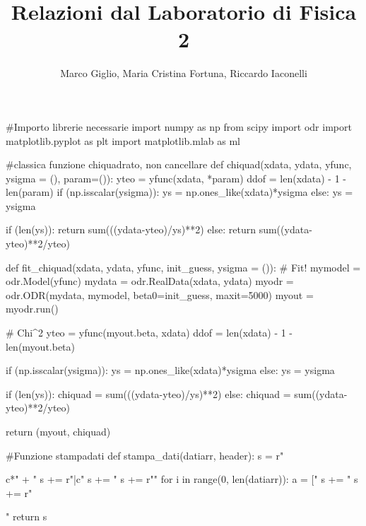 \documentclass[a4paper,10pt]{report}
\author{Marco Giglio, Maria Cristina Fortuna, Riccardo Iaconelli}
\title{Relazioni dal Laboratorio di Fisica 2}
\begin{document}
\maketitle

\tableofcontents

\begin{sagesilent}
#Importo librerie necessarie
import numpy as np
from scipy import odr
import matplotlib.pyplot as plt
import matplotlib.mlab as ml

#classica funzione chiquadrato, non cancellare
def chiquad(xdata, ydata, yfunc, ysigma = (), param=()):
    yteo = yfunc(xdata, *param)
    ddof = len(xdata) - 1 - len(param)
    if (np.isscalar(ysigma)):
        ys = np.ones_like(xdata)*ysigma
    else:
        ys = ysigma
 
    if (len(ys)):
        return sum(((ydata-yteo)/ys)**2)
    else:
        return sum((ydata-yteo)**2/yteo)

def fit_chiquad(xdata, ydata, yfunc, init_guess, ysigma = ()):
    # Fit!
    mymodel = odr.Model(yfunc)
    mydata = odr.RealData(xdata, ydata)
    myodr = odr.ODR(mydata, mymodel, beta0=init_guess, maxit=5000)
    myout = myodr.run()
    
    # Chi^2
    yteo = yfunc(myout.beta, xdata)
    ddof = len(xdata) - 1 - len(myout.beta)

    if (np.isscalar(ysigma)):
        ys = np.ones_like(xdata)*ysigma
    else:
        ys = ysigma
 
    if (len(ys)):
        chiquad = sum(((ydata-yteo)/ys)**2)
    else:
        chiquad = sum((ydata-yteo)**2/yteo)

    return (myout, chiquad)
        
#Funzione stampadati
def stampa_dati(datiarr, header):
  s = r"\begin{tabular}{c*{" + "%
  s += r"}{|c}}"
  s += "%
  s += r"\midrule"
  for i in range(0, len(datiarr)):
    a = ["%
    s += "%
  s += r"\end{tabular}"
  return s
        
\end{sagesilent}



%
%
% 

% 
% 

% 
% 
%
% 
% 
%
% 
\end{document}
